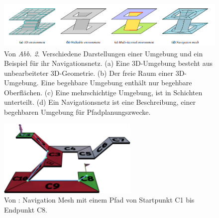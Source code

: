 \begin{figure}[H] %
	\centering
	\includegraphics[width=\textwidth]{images/navigation_mesh_16.png}
	\caption{Von \cite[~S. 93]{Mesh:16} \textit{Abb. 2}. Verschiedene Darstellungen einer Umgebung und ein Beispiel für ihr Navigationsnetz. (a) Eine 3D-Umgebung besteht aus unbearbeiteter 3D-Geometrie. (b) Der freie Raum einer 3D-Umgebung. Eine begehbare Umgebung enthält nur begehbare Oberflächen. (c) Eine mehrschichtige Umgebung, ist in Schichten unterteilt. (d) Ein Navigationsnetz ist eine Beschreibung, einer begehbaren Umgebung für Pfadplanungszwecke.}
	\label{sec1a}
\end{figure}
\begin{figure}[H] %
	\centering
	\includegraphics[width=0.6\textwidth]{images/mesh_with_path.png}
	\caption{Von \cite{Mesh:18}: Navigation Mesh mit einem Pfad von Startpunkt C1 bis Endpunkt C8.}
	\label{sec1b}
\end{figure}


